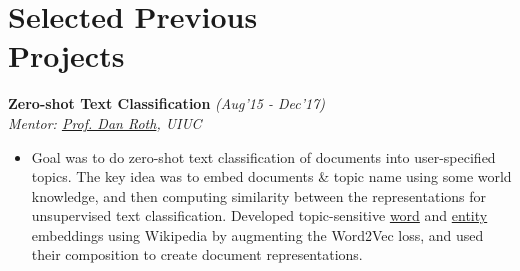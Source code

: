 \section{\mysidestyle Selected Previous\\Projects}
\vspace{0mm}
\textsf{\textbf{Zero-shot Text Classification}} \hfill\textit{\small(Aug'15 - Dec'17)}
\\ {\textit{Mentor: \href{http://www.cis.upenn.edu/~danroth/}{Prof. Dan Roth}, UIUC}} \hfill{}
\vspace{0.05cm}
\normalsize
\vspace{0.05cm}
\begin{itemize}[leftmargin=*]\compresslist
\item[] Goal was to do zero-shot text classification of documents into user-specified topics. The key idea was to embed documents \& topic name using some world knowledge, and then computing similarity between the representations for unsupervised text classification. Developed topic-sensitive \href{https://shatu.github.io/\#topic-emb}{word} and \href{https://shatu.github.io/\#entity-emb}{entity} embeddings using Wikipedia by augmenting the Word2Vec loss, and used their composition to create document representations.
\end{itemize}


